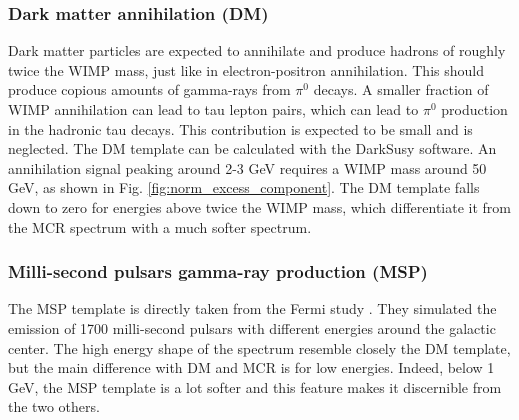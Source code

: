 %
%
%


\subsubsection{Dark matter annihilation (DM)}

Dark matter particles are expected to annihilate and produce hadrons of roughly twice the WIMP mass, just like in electron-positron annihilation. This should produce copious amounts of gamma-rays from $\pi^0$ decays. A smaller fraction of WIMP annihilation can lead to tau lepton pairs, which can lead to $\pi^0$ production in the hadronic tau decays. This contribution is expected to be small and is neglected. The DM template can be calculated with the DarkSusy software. %
An annihilation signal peaking around 2-3 GeV requires a WIMP mass around 50 GeV, as shown in Fig. \ref{fig:norm_excess_component}. 
The DM template falls down to zero for energies above twice the WIMP mass, which differentiate it from the MCR spectrum with a much softer spectrum. 

%


\subsubsection{Milli-second pulsars gamma-ray production (MSP)}

The MSP template is directly taken from the Fermi study %
. They simulated the emission of 1700 milli-second pulsars with different energies around the galactic center.
The high energy shape of the spectrum resemble closely the DM template, but the main difference with DM and MCR is for low energies. Indeed, below 1 GeV, the MSP template is a lot softer and this feature makes it discernible from the two others.

